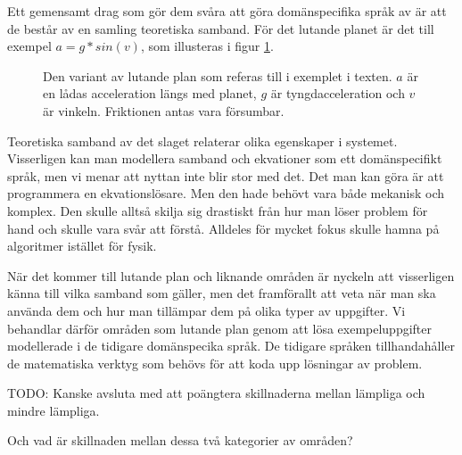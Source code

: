 \begin{binge}
Ett gemensamt drag som gör dem svåra att göra domänspecifika språk av är att de består av en samling teoretiska samband. För det lutande planet är det till exempel $a = g * sin(v)$, som illusteras i figur \ref{fig:lutande_plan}.

\begin{figure}[tph]
  \caption{Den variant av lutande plan som referas till i exemplet i texten. $a$ är en lådas acceleration längs med planet, $g$ är tyngdacceleration och $v$ är vinkeln. Friktionen antas vara försumbar.}
  \label{fig:lutande_plan}
\end{figure}

Teoretiska samband av det slaget relaterar olika egenskaper i systemet. Visserligen kan man modellera samband och ekvationer som ett domänspecifikt språk, men vi menar att nyttan inte blir stor med det. Det man kan göra är att programmera en ekvationslösare. Men den hade behövt vara både mekanisk och komplex. Den skulle alltså skilja sig drastiskt från hur man löser problem för hand och skulle vara svår att förstå. Alldeles för mycket fokus skulle hamna på algoritmer istället för fysik.

När det kommer till lutande plan och liknande områden är nyckeln att visserligen känna till vilka samband som gäller, men det framförallt att veta när man ska använda dem och hur man tillämpar dem på olika typer av uppgifter. Vi behandlar därför områden som lutande plan genom att lösa exempeluppgifter modellerade i de tidigare domänspecika språk. De tidigare språken tillhandahåller de matematiska verktyg som behövs för att koda upp lösningar av problem.


TODO: Kanske avsluta med att poängtera skillnaderna mellan lämpliga och mindre lämpliga.

Och vad är skillnaden mellan dessa två kategorier av områden?


\end{binge}

